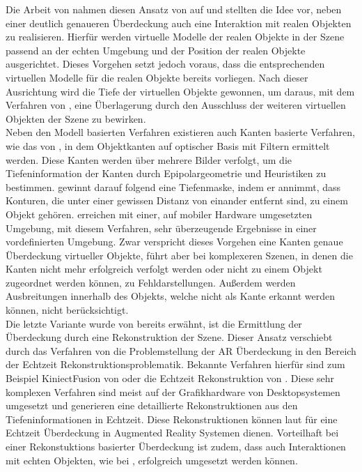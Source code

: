Die Arbeit von \citet{breen1996interactive} nahmen diesen Ansatz von \citet{wloka1995resolving} auf und stellten die Idee vor, neben einer deutlich genaueren Überdeckung auch eine Interaktion mit realen Objekten zu realisieren. Hierfür werden virtuelle Modelle der realen Objekte in der Szene passend an der echten Umgebung und der Position der realen Objekte ausgerichtet. Dieses Vorgehen setzt jedoch voraus, dass die entsprechenden virtuellen Modelle für die realen Objekte bereits vorliegen. Nach dieser Ausrichtung wird die Tiefe der virtuellen Objekte gewonnen, um daraus, mit dem Verfahren von \citet{wloka1995resolving}, eine Überlagerung durch den Ausschluss der weiteren virtuellen Objekten der Szene zu bewirken. \\

Neben den Modell basierten Verfahren existieren auch Kanten basierte Verfahren, wie das von \citet{berger1997resolving}, in dem Objektkanten auf optischer Basis mit Filtern ermittelt werden. Diese Kanten werden über mehrere Bilder verfolgt, um die Tiefeninformation der Kanten durch Epipolargeometrie und Heuristiken zu bestimmen. \citet{berger1997resolving} gewinnt darauf folgend  eine Tiefenmaske, indem er annimmt, dass Konturen, die unter einer gewissen Distanz von einander entfernt sind, zu einem Objekt gehören. \citet{klein2004sensor} erreichen mit einer, auf mobiler Hardware umgesetzten Umgebung, mit diesem Verfahren, sehr überzeugende Ergebnisse in einer vordefinierten Umgebung. Zwar verspricht dieses Vorgehen eine Kanten genaue Überdeckung virtueller Objekte, führt aber bei komplexeren Szenen, in denen die Kanten nicht mehr erfolgreich verfolgt werden oder nicht zu einem Objekt zugeordnet werden können, zu Fehldarstellungen. Außerdem werden Ausbreitungen innerhalb des Objekts, welche nicht als Kante erkannt werden können, nicht berücksichtigt.\\

Die letzte Variante wurde von \citet{breen1996interactive} bereits erwähnt, ist die Ermittlung der Überdeckung durch eine Rekonstruktion der Szene. Dieser Ansatz verschiebt durch das Verfahren von \citet{wloka1995resolving} die Problemstellung der AR Überdeckung in den Bereich der Echtzeit Rekonstruktionsproblematik. Bekannte Verfahren hierfür sind zum Beispiel KiniectFusion von \citet{newcombe2011kinectfusion} oder die Echtzeit Rekonstruktion von \citep{niessner2013real}. Diese sehr komplexen Verfahren sind meist auf der Grafikhardware von Desktopsystemen umgesetzt und generieren eine detaillierte Rekonstruktionen aus den Tiefeninformationen in Echtzeit. Diese Rekonstruktionen können laut \citet{newcombe2011kinectfusion} für eine Echtzeit Überdeckung in Augmented Reality Systemen dienen. Vorteilhaft bei einer Rekonstuktions basierter Überdeckung ist zudem, dass auch Interaktionen mit echten Objekten, wie bei \citet{breen1996interactive}, erfolgreich umgesetzt werden können.



